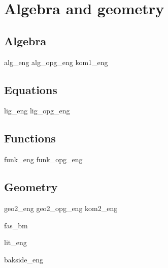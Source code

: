 \part{Algebra and geometry \label{Del2}}
\chapter{Algebra}
\newpage
{alg_eng}
{alg_opg_eng}
\newpage
{kom1_eng}

\chapter{Equations \label{Likningar}}
\newpage
{lig_eng}
{lig_opg_eng}

\chapter{Functions \label{Funksjoner}}
{funk_eng}
{funk_opg_eng}

\chapter{Geometry}
\newpage
{geo2_eng}
{geo2_opg_eng}
\newpage
{kom2_eng}

\newpage
{}
{}
{fas_bm}

{lit_eng}
{\printindex {}
	}
{bakside_eng}













